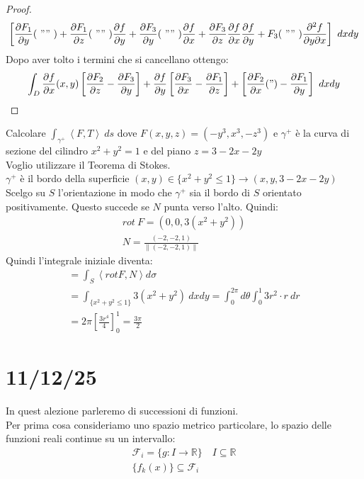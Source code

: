 \documentclass[a4paper, oneside]{article}
\begin{document}
\begin{proof}
\begin{gather*}
    \left[ \frac{\partial F_1}{\partial y} ( \ "" \ ) + \frac{\partial F_1}{\partial z} ( \ "" \ ) \frac{\partial f}{\partial y} + \frac{\partial F_3}{\partial y} ( \ "" \ ) \frac{\partial f}{\partial x} + \frac{\partial F_3}{\partial z}\frac{\partial f}{\partial x}\frac{\partial f}{\partial y} + F_3( \ "" \ ) \frac{\partial^2 f}{\partial y \partial x} \right] \ dxdy
  \end{gather*}
  Dopo aver tolto i termini che si cancellano ottengo:
  \begin{gather*}
    \int_D \frac{\partial f}{\partial x} (x,y) \left[ \frac{\partial F_2}{\partial z} - \frac{\partial F_3}{\partial y} \right] + \frac{\partial f}{\partial y}\left[ \frac{\partial F_3}{\partial x} -\frac{\partial F_1}{\partial z}\right] + \left[ \frac{\partial F_2}{\partial x}( " )- \frac{\partial F_1}{\partial y} \right] \ dxdy   
  \end{gather*}
\end{proof}


\begin{example}
  Calcolare $\int_{\gamma^+} \left\langle F, T\right\rangle \ ds$ dove $F(x,y,z) = (-y^3, x^3, -z^3)$ e 
  $\gamma^+$ è la curva di sezione del cilindro $x^2+y^2=1$ e del piano $z = 3-2x-2y$\\
  Voglio utilizzare il Teorema di Stokes.\\
  $\gamma^+$ è il bordo della superficie $(x,y) \in \{ x^2+y^2 \leq 1 \} \to (x,y,3-2x-2y)$\\
  Scelgo su $S$ l'orientazione in modo che $\gamma^+$ sia il bordo di $S$ orientato positivamente.
  Questo succede se $N$ punta verso l'alto. Quindi:
  \begin{gather*}
    rot \ F = (0,0, 3(x^2+y^2))\\
    N = \frac{(-2,-2,1)}{\left\lVert (-2,-2,1) \right\rVert }
  \end{gather*}
  Quindi l'integrale iniziale diventa:
  \begin{gather*}
    = \int_S \left\langle rot F , N\right\rangle d\sigma\\
    = \int_{\{x^2+y^2 \leq 1\}} 3(x^2+y^2) \ dxdy = \int_0^{2\pi} d\theta \int_0^1 3r^2 \cdot r \ dr\\
    = 2\pi \left[ \frac{3r^4}{4} \right]_0^1 = \frac{3\pi}{2}
  \end{gather*}
\end{example}


\newpage
\section{11/12/25}
In quest alezione parleremo di successioni di funzioni.\\
Per prima cosa consideriamo uno spazio metrico particolare, lo spazio delle funzioni reali continue su un intervallo:
\begin{gather*}
  \mathcal{F}_i = \{ g: I \to \mathbb{R} \} \quad I \subseteq \mathbb{R}\\
  \{f_k (x)\} \subseteq \mathcal{F}_i
\end{gather*} 
\end{document}
